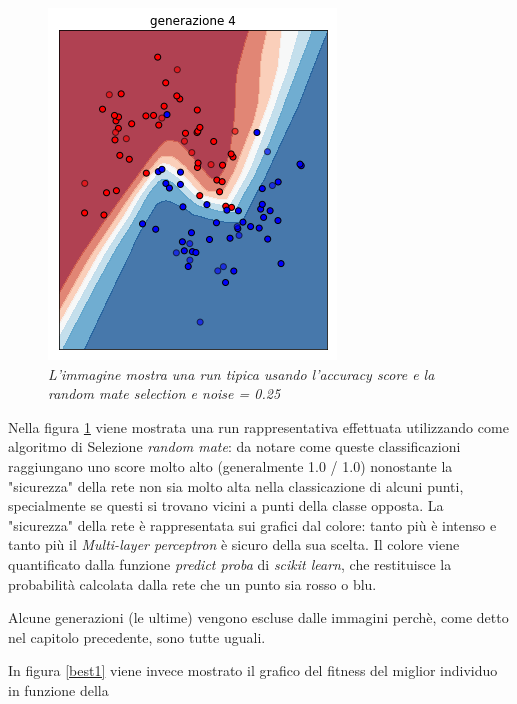 \documentclass[12pt,a4paper]{report}
\begin{document}
\begin{figure}[H]
 \includegraphics[scale = 0.35]{images/moons-rnd-acc./4}
 \caption{\textit{L'immagine mostra una run tipica usando l'accuracy score e la random mate selection e noise = 0.25}}
 \label{moons1}
\end{figure}

Nella figura \ref{moons1} viene mostrata una run rappresentativa effettuata utilizzando come algoritmo di Selezione \textit{random mate}: da notare come queste classificazioni raggiungano uno score molto alto (generalmente 1.0 / 1.0) nonostante la "sicurezza" della rete non sia molto alta nella classicazione di alcuni punti, specialmente se questi si trovano vicini a punti della classe opposta.
La "sicurezza" della rete è rappresentata sui grafici dal colore: tanto più è intenso e tanto  più il \textit{Multi-layer perceptron} è sicuro della sua scelta.
Il colore viene quantificato dalla funzione \textit{predict proba} di \textit{scikit learn}, che restituisce la probabilità calcolata dalla rete che un punto sia rosso o blu.

Alcune generazioni (le ultime) vengono escluse dalle immagini perchè, come detto nel capitolo precedente, sono tutte uguali.

In figura \ref{best1} viene invece mostrato il grafico del fitness del miglior individuo in funzione della 
\end{document}
